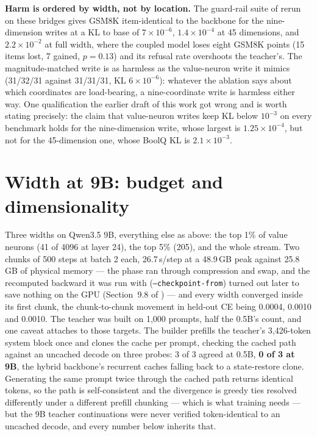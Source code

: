 \documentclass[11pt]{article}
\newcommand{\code}[1]{\texttt{#1}}
\newcommand{\companion}{\citet{furui2026psilm}}
\begin{document}
\textbf{Harm is ordered by width, not by location.} The guard-rail suite of \companion{} rerun on these bridges gives GSM8K item-identical to the backbone for the nine-dimension writes at a KL to base of $7\times10^{-6}$, $1.4\times10^{-4}$ at 45 dimensions, and $2.2\times10^{-2}$ at full width, where the coupled model loses eight GSM8K points (15 items lost, 7 gained, $p = 0.13$) and its refusal rate overshoots the teacher's. The magnitude-matched write is as harmless as the value-neuron write it mimics (31/32/31 against 31/31/31, KL $6\times10^{-6}$): whatever the ablation says about which coordinates are load-bearing, a nine-coordinate write is harmless either way. One qualification the earlier draft of this work got wrong and is worth stating precisely: the claim that value-neuron writes keep KL below $10^{-3}$ on every benchmark holds for the nine-dimension write, whose largest is $1.25\times10^{-4}$, but not for the 45-dimension one, whose BoolQ KL is $2.1\times10^{-3}$.

\section{Width at 9B: budget and dimensionality}
\label{sec:const9b}

Three widths on Qwen3.5 9B, everything else as above: the top 1\% of value neurons (41 of 4096 at layer 24), the top 5\% (205), and the whole stream. Two chunks of 500 steps at batch 2 each, 26.7\,s/step at a 48.9\,GB peak against 25.8\,GB of physical memory --- the phase ran through compression and swap, and the recomputed backward it was run with (\code{--checkpoint-from}) turned out later to save nothing on the GPU (Section~9.8 of \companion{}) --- and every width converged inside its first chunk, the chunk-to-chunk movement in held-out CE being 0.0004, 0.0010 and 0.0010. The teacher was built on 1,000 prompts, half the 0.5B's count, and one caveat attaches to those targets. The builder prefills the teacher's 3,426-token system block once and clones the cache per prompt, checking the cached path against an uncached decode on three probes: 3 of 3 agreed at 0.5B, \textbf{0 of 3 at 9B}, the hybrid backbone's recurrent caches falling back to a state-restore clone. Generating the same prompt twice through the cached path returns identical tokens, so the path is self-consistent and the divergence is greedy ties resolved differently under a different prefill chunking --- which is what training needs --- but the 9B teacher continuations were never verified token-identical to an uncached decode, and every number below inherits that.
\end{document}
